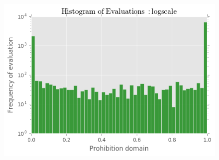 \documentclass[paper=a4, fontsize=11pt]{scrartcl}
\numberwithin{equation}{section}		%
\numberwithin{figure}{section}			%
\numberwithin{table}{section}				%
\begin{document}
\begin{figure}[ht]
\centering
\includegraphics[scale=0.65]{histo_EP.png}
\caption{} 
\label{evaluations-histogram}
\end{figure}
\end{document}
